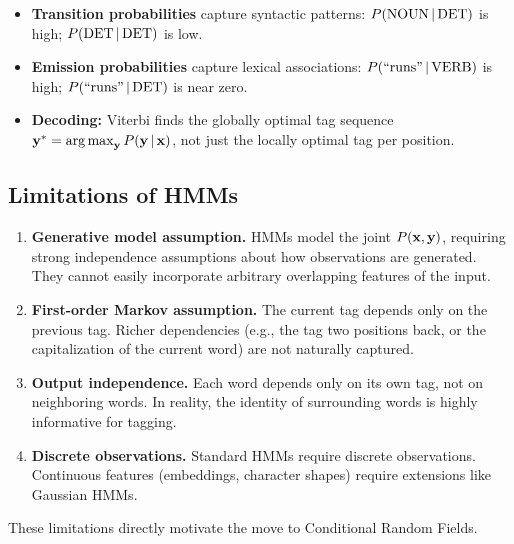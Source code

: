 \begin{itemize}
    \item \textbf{Transition probabilities} capture syntactic patterns:
          $P(\text{NOUN} \,|\, \text{DET})$ is high; $P(\text{DET} \,|\, \text{DET})$
          is low.
    \item \textbf{Emission probabilities} capture lexical associations:
          $P(\text{``runs''} \,|\, \text{VERB})$ is high;
          $P(\text{``runs''} \,|\, \text{DET})$ is near zero.
    \item \textbf{Decoding:} Viterbi finds the globally optimal tag sequence
          $\mathbf{y}^* = \operatorname*{arg\,max}_{\mathbf{y}} P(\mathbf{y} \,|\, \mathbf{x})$, not just the locally
          optimal tag per position.
\end{itemize}

\subsection{Limitations of HMMs}

\begin{enumerate}
    \item \textbf{Generative model assumption.}  HMMs model the joint
    $P(\mathbf{x}, \mathbf{y})$, requiring strong independence assumptions about how
    observations are generated.  They cannot easily incorporate arbitrary
    overlapping features of the input.

    \item \textbf{First-order Markov assumption.}  The current tag depends
    only on the previous tag.  Richer dependencies (e.g., the tag two
    positions back, or the capitalization of the current word) are not
    naturally captured.

    \item \textbf{Output independence.}  Each word depends only on its own
    tag, not on neighboring words.  In reality, the identity of surrounding
    words is highly informative for tagging.

    \item \textbf{Discrete observations.}  Standard HMMs require discrete
    observations.  Continuous features (embeddings, character shapes) require
    extensions like Gaussian HMMs.
\end{enumerate}

These limitations directly motivate the move to Conditional Random Fields.


